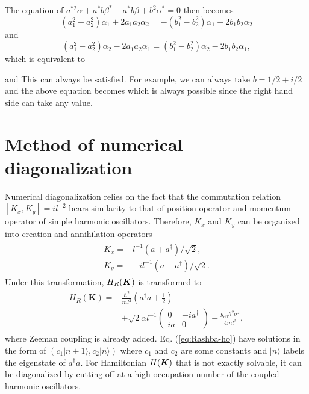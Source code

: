 \documentclass[aps, prb, showpacs, twocolumn, notitlepage, superscriptaddress]{revtex4-1}
\begin{document}
The equation of $a^{*2}\alpha+a^{*}b\beta^{*}-a^{*}b\beta+b^{2}\alpha^{*}=0$ then becomes
\begin{equation}
(a_{1}^{2}-a_{2}^{2})\alpha_{1}+2a_{1}a_{2}\alpha_{2}=-(b_{1}^{2}-b_{2}^{2})\alpha_{1}-2b_{1}b_{2}\alpha_{2}
\end{equation}
and 
\begin{equation}
    (a_{1}^{2}-a_{2}^{2})\alpha_{2}-2a_{1}a_{2}\alpha_{1}=(b_{1}^{2}-b_{2}^{2})\alpha_{2}-2b_{1}b_{2}\alpha_{1},
\end{equation}
which is equivalent to 

and 
This can always be satisfied. For example, we can always take $b=1/2+i/2$
and the above equation becomes
which is always possible since the right hand side  can take any value.


\section{Method of numerical diagonalization}\label{sec:numerical}

Numerical diagonalization relies on the fact that the commutation relation $[K_x,K_y]=il^{-2}$ bears similarity to that of position operator and momentum operator of simple harmonic oscillators. Therefore, $K_x$ and $K_y$ can be organized into creation and annihilation operators
\begin{align}
\begin{split}
K_x=&l^{-1}(a+a^\dagger)/\sqrt{2},\\
K_y=&-il^{-1}(a-a^\dagger)/\sqrt{2}.
\end{split}
\end{align}
Under this transformation, $H_R(\boldsymbol{K})$ is transformed to
\begin{align}
\begin{split}
H_{R}(\boldsymbol{K})=&\frac{\hbar^2}{ml^2}(a^{\dagger}a+\frac{1}{2})
\\&+\sqrt{2}\alpha l^{-1}\left(\begin{array}{cc}
0 & -ia^{\dagger}\\
ia & 0
\end{array}\right)
-\frac{g_\text{eff}\hbar^2\sigma^z}{4ml^2},
\end{split}\label{eq:Rashba-ho}
\end{align}
where Zeeman coupling is already added. Eq. (\ref{eq:Rashba-ho}) have solutions in the form of $(c_1|n+1\rangle,c_2|n\rangle)$ where $c_1$ and $c_2$ are some constants and $|n\rangle$ labels the eigenstate of $a^\dagger a$. For Hamiltonian $H(\boldsymbol{K})$ that is not exactly solvable, it can be diagonalized by cutting off at a high occupation number of the coupled harmonic oscillators.
\end{document}
